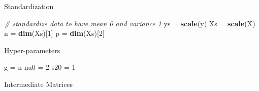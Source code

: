 \documentclass[ignorenonframetext,]{beamer}
\newenvironment{Shaded}{\begin{snugshade}}{\end{snugshade}}
\newcommand{\KeywordTok}[1]{\textcolor[rgb]{0.13,0.29,0.53}{\textbf{#1}}}
\newcommand{\DataTypeTok}[1]{\textcolor[rgb]{0.13,0.29,0.53}{#1}}
\newcommand{\DecValTok}[1]{\textcolor[rgb]{0.00,0.00,0.81}{#1}}
\newcommand{\StringTok}[1]{\textcolor[rgb]{0.31,0.60,0.02}{#1}}
\newcommand{\CommentTok}[1]{\textcolor[rgb]{0.56,0.35,0.01}{\textit{#1}}}
\newcommand{\OperatorTok}[1]{\textcolor[rgb]{0.81,0.36,0.00}{\textbf{#1}}}
\newcommand{\NormalTok}[1]{#1}
\begin{document}
\begin{frame}[fragile]{Standardization}

\begin{Shaded}
\begin{Highlighting}[]
\CommentTok{# standardize data to have mean 0 and variance 1}
\NormalTok{ys =}\StringTok{ }\KeywordTok{scale}\NormalTok{(y)}
\NormalTok{Xs =}\StringTok{ }\KeywordTok{scale}\NormalTok{(X)}
\NormalTok{n =}\StringTok{ }\KeywordTok{dim}\NormalTok{(Xs)[}\DecValTok{1}\NormalTok{]}
\NormalTok{p =}\StringTok{ }\KeywordTok{dim}\NormalTok{(Xs)[}\DecValTok{2}\NormalTok{]}
\end{Highlighting}
\end{Shaded}

\end{frame}

\begin{frame}[fragile]{Hyper-parameters}

\begin{Shaded}
\begin{Highlighting}[]
\NormalTok{g =}\StringTok{ }\NormalTok{n}
\NormalTok{nu0 =}\StringTok{ }\DecValTok{2}
\NormalTok{s20 =}\StringTok{ }\DecValTok{1}
\end{Highlighting}
\end{Shaded}

\end{frame}

\begin{frame}[fragile]{Intermediate Matrices}

\begin{Shaded}
\end{Shaded}

\end{frame}
\end{document}
